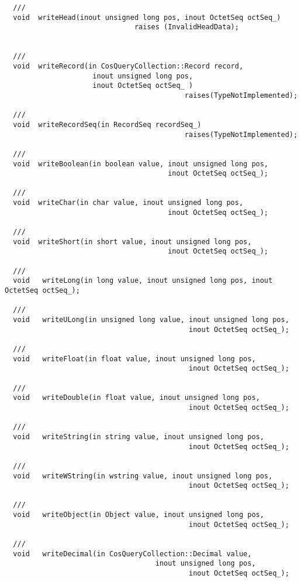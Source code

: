 \documentclass[10pt]{article}
\begin{document}
\begin{verbatim}
  ///
  void  writeHead(inout unsigned long pos, inout OctetSeq octSeq_)
                               raises (InvalidHeadData);


  ///
  void  writeRecord(in CosQueryCollection::Record record,
                     inout unsigned long pos,
                     inout OctetSeq octSeq_ )
                                           raises(TypeNotImplemented);

  ///
  void  writeRecordSeq(in RecordSeq recordSeq_)
                                           raises(TypeNotImplemented);

  ///
  void  writeBoolean(in boolean value, inout unsigned long pos,
                                       inout OctetSeq octSeq_);
                                          
  ///
  void  writeChar(in char value, inout unsigned long pos,
                                       inout OctetSeq octSeq_);

  ///
  void  writeShort(in short value, inout unsigned long pos,
                                       inout OctetSeq octSeq_);

  ///
  void   writeLong(in long value, inout unsigned long pos, inout OctetSeq octSeq_);

  ///
  void   writeULong(in unsigned long value, inout unsigned long pos, 
                                            inout OctetSeq octSeq_);

  ///
  void   writeFloat(in float value, inout unsigned long pos,
                                            inout OctetSeq octSeq_);

  ///
  void   writeDouble(in float value, inout unsigned long pos,
                                            inout OctetSeq octSeq_);
  
  ///
  void   writeString(in string value, inout unsigned long pos,
                                            inout OctetSeq octSeq_);

  ///
  void   writeWString(in wstring value, inout unsigned long pos,
                                            inout OctetSeq octSeq_);

  ///
  void   writeObject(in Object value, inout unsigned long pos,
                                            inout OctetSeq octSeq_);

  ///
  void   writeDecimal(in CosQueryCollection::Decimal value, 
                                    inout unsigned long pos,
                                            inout OctetSeq octSeq_);


\end{verbatim}
\end{document}
